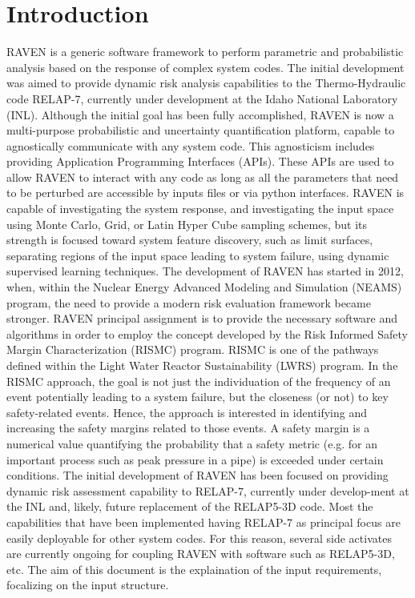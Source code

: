 \section{Introduction}
RAVEN  is a generic software framework to perform parametric and probabilistic analysis based on the response of complex system codes. The initial development was aimed to provide dynamic risk analysis capabilities to the Thermo-Hydraulic code RELAP-7, currently under development at the Idaho National Laboratory (INL). Although the initial goal has been fully accomplished, RAVEN is now a multi-purpose probabilistic and uncertainty quantification platform, capable to agnostically communicate with any system code. This agnosticism includes providing Application Programming Interfaces (APIs). These APIs are used to allow RAVEN to interact with any code as long as all the parameters that need to be perturbed are accessible by inputs files or via python interfaces. 
RAVEN is capable of investigating the system response, and investigating the input space using Monte Carlo, Grid, or Latin Hyper Cube sampling schemes, but its strength is focused toward system feature discovery, such as limit surfaces, separating regions of the input space leading to system failure, using dynamic supervised learning techniques. 
The development of RAVEN has started in 2012, when, within the Nuclear Energy Advanced Modeling and Simulation (NEAMS) program, the need to provide a modern risk evaluation framework became stronger. 
RAVEN principal assignment is to provide the necessary software and algorithms in order to employ the concept developed by the Risk Informed Safety Margin Characterization (RISMC) program. RISMC is one of the pathways defined within the Light Water Reactor Sustainability (LWRS) program. In the RISMC approach, the goal is not just the individuation of the frequency of an event potentially leading to a system failure, but the closeness (or not) to key safety-related events. Hence, the approach is interested in identifying and increasing the safety margins related to those events. A safety margin is a numerical value quantifying the probability that a safety metric (e.g. for an important process such as peak pressure in a pipe) is exceeded under certain conditions.
The initial development of RAVEN has been focused on providing dynamic risk assessment capability to RELAP-7, currently under develop-ment at the INL and, likely, future replacement of the RELAP5-3D  code.
Most the capabilities that have been implemented having RELAP-7 as principal focus are easily deployable for other system codes. For this reason, several side activates are currently ongoing for coupling RAVEN with software such as RELAP5-3D, etc.
The aim of this document is the explaination of the input requirements, focalizing on the input structure.


